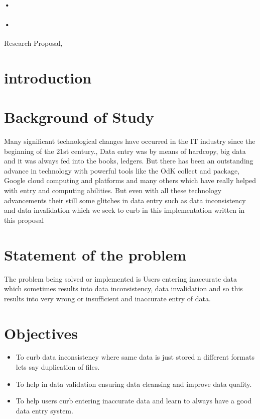 \documentclass[12pt,]{article}
\begin{document}
\begin{titlepage}
\paragraph*{•}
\paragraph*{•}
  \begin{flushright}
  Research Proposal,\\
 
 \tableofcontents

  \end{flushright}
\date{\today}
\end{titlepage}

\newpage




\section{introduction}
\section{Background of Study}
Many significant technological changes have occurred in the IT industry since the beginning of the 21st century., Data entry was by means of hardcopy, big data and it was always fed into the books, ledgers. But there has been an outstanding advance in technology with powerful tools like the OdK collect and package, Google cloud computing and platforms and many others which have really helped with entry and computing abilities. But even with all these technology advancements their still some glitches in data entry such as data inconsistency and data invalidation which we seek to curb in this implementation written in this proposal
\section{Statement of the problem}
The problem being solved or implemented is Users entering inaccurate data which sometimes results into data inconsistency, data invalidation and so this results into very wrong or insufficient and inaccurate entry of data.
\section{ Objectives}
\begin{itemize}
\item To curb data inconsistency where same data is just stored n different formats lets say duplication of files.
\item To help in data validation ensuring data cleansing and improve data quality.
\item To help users curb entering inaccurate data and learn to always have a good data entry system.
\end{itemize}
\end{document}
